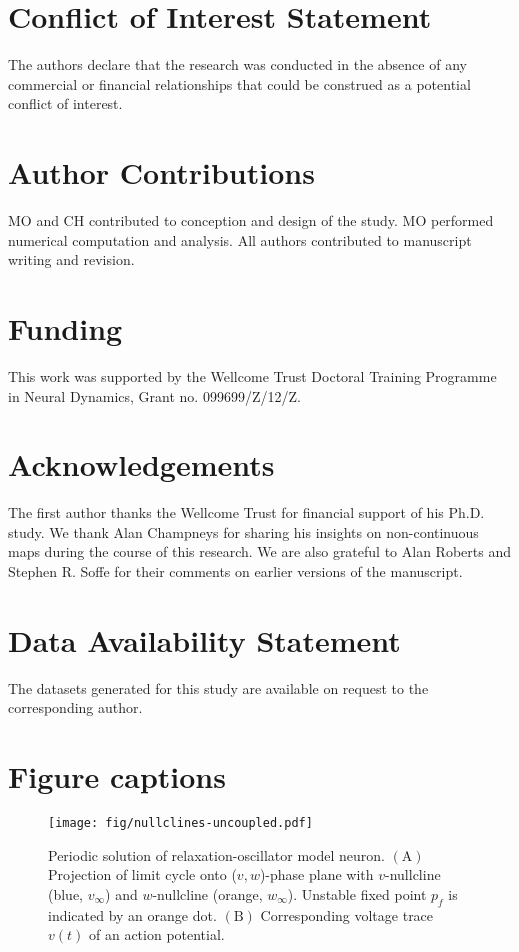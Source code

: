 \documentclass[utf8, draft]{frontiersFPHY} %
\begin{document}





\section*{Conflict of Interest Statement}
The authors declare that the research was conducted in the absence of any commercial or
financial relationships that could be construed as a potential conflict of interest.

\section*{Author Contributions}
MO and CH contributed to conception and design of the study.
MO performed numerical computation and analysis.
All authors contributed to manuscript writing and revision.

\section*{Funding}
This work was supported by the Wellcome Trust Doctoral Training Programme in Neural
Dynamics, Grant no. 099699/Z/12/Z.

\section*{Acknowledgements}
The first author thanks the Wellcome Trust for financial support of his Ph.D. study.
We thank Alan Champneys for sharing his insights on non-continuous maps during the course of this research.
We are also grateful to Alan Roberts and Stephen R. Soffe for their comments on earlier versions of the manuscript.

\section*{Data Availability Statement}
The datasets generated for this study are available on request to the corresponding author.



\section*{Figure captions}

\begin{figure}[h!]
  \centering
  \texttt{[image: fig/nullclines-uncoupled.pdf]}
  \caption{Periodic solution of relaxation-oscillator model neuron. \(\bm{\mathrm{(A)}}\)
    Projection of limit cycle onto (\(v,w\))-phase plane with \(v\)-nullcline (blue,
    \(v_\infty\)) and \(w\)-nullcline (orange, \(w_\infty\)). Unstable fixed point \(p_{f}\)
    is indicated by an orange dot. \(\bm{\mathrm{(B)}}\) Corresponding voltage trace
    \(v(t)\) of an action potential.~\label{fig:nullclines}}
\end{figure}
\end{document}
